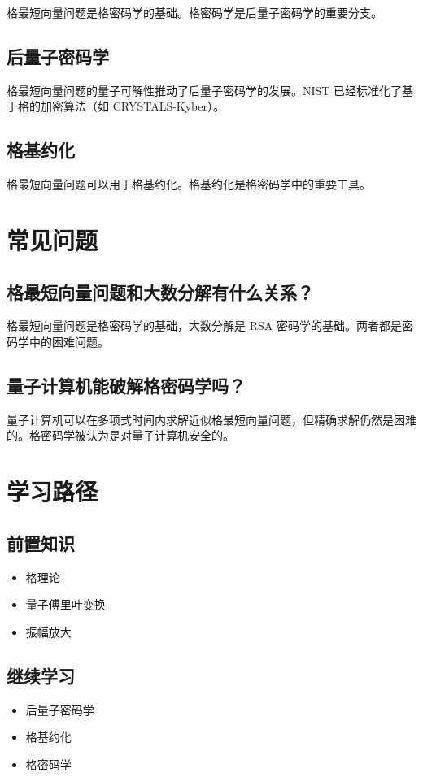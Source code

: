 \documentclass[12pt,a4paper]{article}
\begin{document}
格最短向量问题是格密码学的基础。格密码学是后量子密码学的重要分支。

\subsection{后量子密码学}

格最短向量问题的量子可解性推动了后量子密码学的发展。NIST 已经标准化了基于格的加密算法（如 CRYSTALS-Kyber）。

\subsection{格基约化}

格最短向量问题可以用于格基约化。格基约化是格密码学中的重要工具。

\section{常见问题}

\subsection{格最短向量问题和大数分解有什么关系？}

格最短向量问题是格密码学的基础，大数分解是 RSA 密码学的基础。两者都是密码学中的困难问题。

\subsection{量子计算机能破解格密码学吗？}

量子计算机可以在多项式时间内求解近似格最短向量问题，但精确求解仍然是困难的。格密码学被认为是对量子计算机安全的。

\section{学习路径}

\subsection{前置知识}
\begin{itemize}
  \item 格理论
  \item 量子傅里叶变换
  \item 振幅放大
\end{itemize}

\subsection{继续学习}
\begin{itemize}
  \item 后量子密码学
  \item 格基约化
  \item 格密码学
\end{itemize}
\end{document}
